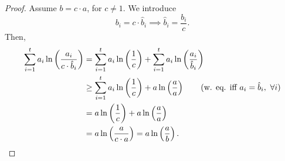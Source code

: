 \begin{proof}
Assume $b = c \cdot a$, for $c \neq 1$.
We introduce
\begin{equation*}
	b_i = c \cdot \hat{b}_i \implies \hat{b}_i = \frac{b_i}{c}.
\end{equation*}
Then,
\begin{align*}
	\sum_{i = 1}^{t} a_i \ln \left( \frac{a_i}{c \cdot \hat{b}_i} \right)
	& =
	\sum_{i = 1}^{t} a_i \ln \left( \frac{1}{c} \right) + \sum_{i = 1}^{t} a_i \ln \left( \frac{a_i}{\hat{b}_i} \right)
	\\
	& \ge
	\sum_{i = 1}^{t} a_i \ln \left( \frac{1}{c} \right) + a \ln \left( \frac{a}{a} \right)
	\tag{w. eq. iff $a_i = \hat{b}_i,\ \forall i$}
	\\
	& =
	a \ln \left( \frac{1}{c} \right) + a \ln \left( \frac{a}{a} \right)
	\\
	& =
	a \ln \left( \frac{a}{c \cdot a} \right)
	=
	a \ln \left( \frac{a}{b} \right).
\end{align*}
\end{proof}
